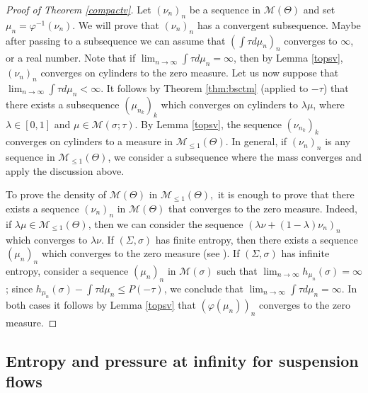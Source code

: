 \documentclass[letterpaper,11pt]{amsart}
\theoremstyle{plain}
\theoremstyle{plain}
\theoremstyle{definition}
\theoremstyle{remark}
\def\M{{\mathcal M}}
\begin{document}
\begin{proof}[Proof of Theorem \ref{compactv}] Let $(\nu_n)_n$ be a sequence in $\M(\Theta)$ and set $\mu_n=\varphi^{-1}(\nu_n)$. We will prove that $(\nu_n)_n$ has a convergent subsequence. Maybe after passing to a subsequence we can assume that $(\int \tau d\mu_n)_n$ converges to $\infty$, or a real number. 
Note that if $\lim_{n\to\infty}\int \tau d\mu_n=\infty$, then by Lemma \ref{topsv}, $(\nu_{n})_n$ converges on cylinders to the zero measure. Let us now suppose that $\lim_{n\to\infty}\int\tau d\mu_n<\infty$. It follows by Theorem \ref{thm:bsctm} (applied to $-\tau$) that there exists a subsequence $(\mu_{n_k})_k$ which converges on cylinders to $\lambda \mu$, where $\lambda\in [0,1]$ and  $\mu\in \M(\sigma;\tau)$. By Lemma \ref{topsv}, the sequence $(\nu_{n_k})_k$ converges on cylinders to a measure in $\M_{\le 1}(\Theta)$. In general, if $(\nu_n)_n$ is any sequence in $\M_{\le1}(\Theta)$, we consider a subsequence where the mass converges and apply the discussion above.

To prove the density of $\M(\Theta)$ in $\M_{\le 1}(\Theta),$ it is enough to prove that there exists a sequence $(\nu_n)_n$ in $\M(\Theta)$ that converges to the zero measure. Indeed, if $\lambda\mu\in \M_{\le 1}(\Theta)$, then we can consider the sequence $(\lambda\nu+(1-\lambda)\nu_n)_n$ which converges to $\lambda\nu$. If $(\Sigma,\sigma)$ has finite entropy, then there exists a sequence $(\mu_n)_n$ which converges to the zero measure (see \cite[Lemma 4.6]{iv}). If $(\Sigma,\sigma)$ has infinite entropy, consider a sequence $(\mu_n)_n$ in $\M(\sigma)$ such that $\lim_{n\to\infty}h_{\mu_n}(\sigma)=\infty$; since $h_{\mu_n}(\sigma)-\int \tau d\mu_n\le P(-\tau)$, we conclude that $\lim_{n\to\infty}\int \tau d\mu_n=\infty$. In both cases it follows by Lemma \ref{topsv} that $(\varphi(\mu_n))_n$ converges to the zero measure. 
\end{proof}


 
\subsection{Entropy and pressure at infinity for suspension flows}
\end{document}
